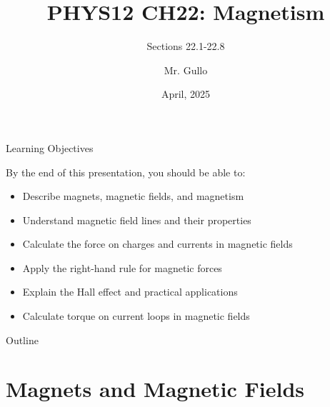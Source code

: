 \documentclass{beamer}
\title[CH22 Magnetism]{PHYS12 CH22: Magnetism}
\subtitle{Sections 22.1-22.8}
\author[Mr. Gullo]{Mr. Gullo}
\date[April 2025]{April, 2025}
\begin{document}
\begin{frame}
\titlepage
\end{frame}

\begin{frame}{Learning Objectives}
\begin{block}{By the end of this presentation, you should be able to:}
\begin{itemize}
\item Describe magnets, magnetic fields, and magnetism
\item Understand magnetic field lines and their properties
\item Calculate the force on charges and currents in magnetic fields
\item Apply the right-hand rule for magnetic forces
\item Explain the Hall effect and practical applications
\item Calculate torque on current loops in magnetic fields
\end{itemize}
\end{block}
\end{frame}

\begin{frame}{Outline}
\tableofcontents
\end{frame}

\section{Magnets and Magnetic Fields}
\end{document}
